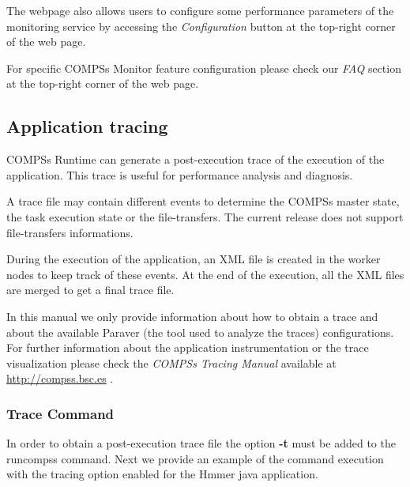 
The webpage also allows users to configure some performance parameters of the monitoring service by accessing the 
\textit{Configuration} button at the top-right corner of the web page. 

For specific COMPSs Monitor feature configuration please check our \textit{FAQ} section at the top-right corner of the web page. 


\subsection{Application tracing}
\label{sec:Tracing}
COMPSs Runtime can generate a post-execution trace of the execution of the application. This trace is useful for
performance analysis and diagnosis.

A trace file may contain different events to determine the COMPSs master state, the task execution state or the file-transfers.
The current release does not support file-transfers informations.

During the execution of the application, an XML file is created in the worker nodes to keep track of 
these events. At the end of the execution, all the XML files are merged to get a final trace file.

In this manual we only provide information about how to obtain a trace and about the available Paraver (the tool used to analyze the traces) configurations. For further
information about the application instrumentation or the trace visualization please check the \textit{COMPSs Tracing Manual} 
available at \url{http://compss.bsc.es} .

\subsubsection{Trace Command}
In order to obtain a post-execution trace file the option \textbf{-t}  must be added to the runcompss command. Next we provide an
example of the command execution with the tracing option enabled for the Hmmer java application.


